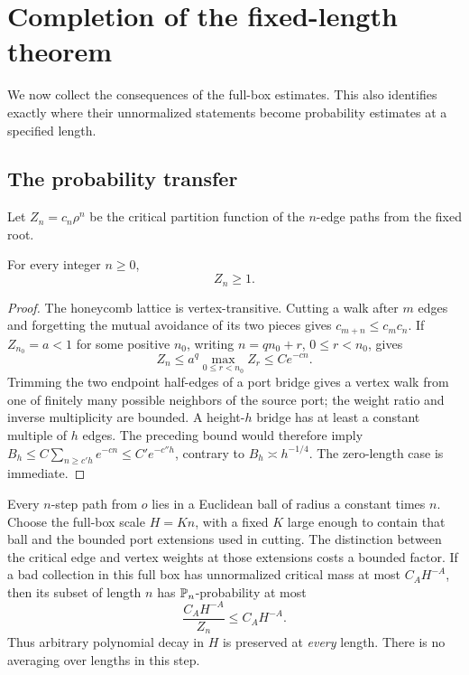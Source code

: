 \section{Completion of the fixed-length theorem}\label{sec:fixed-length}
We now collect the consequences of the full-box estimates. This also identifies exactly where their unnormalized statements become probability estimates at a specified length.

\subsection{The probability transfer}
Let \(Z_n=c_n\rho^n\) be the critical partition function of the
\(n\)-edge paths from the fixed root.
\begin{lemma}\label{09_fast_paths:normalization}
For every integer \(n\ge0\),
\begin{equation}\label{eq:normalization}
 Z_n\ge1.
\end{equation}
\end{lemma}
\begin{proof}
The honeycomb lattice is vertex-transitive. Cutting a walk after \(m\)
edges and forgetting the mutual avoidance of its two pieces gives
\(c_{m+n}\le c_mc_n\). If \(Z_{n_0}=a<1\) for some positive
\(n_0\), writing \(n=qn_0+r\), \(0\le r<n_0\), gives
\[
 Z_n\le a^q\max_{0\le r<n_0}Z_r\le Ce^{-cn}.
\]
Trimming the two endpoint half-edges of a port bridge gives a vertex
walk from one of finitely many possible neighbors of the source port;
the weight ratio and inverse multiplicity are bounded. A height-\(h\)
bridge has at least a constant multiple of \(h\) edges. The preceding
bound would therefore imply
\(B_h\le C\sum_{n\ge c'h}e^{-cn}\le C'e^{-c''h}\), contrary to
\(B_h\asymp h^{-1/4}\). The zero-length case is immediate.
\end{proof}

Every $n$-step path from $o$ lies in a Euclidean ball of radius a constant times $n$. Choose the full-box scale $H=Kn$, with a fixed $K$ large enough to contain that ball and the bounded port extensions used in cutting. The distinction between the critical edge and vertex weights at those extensions costs a bounded factor. If a bad collection in this full box has unnormalized critical mass at most $C_AH^{-A}$, then its subset of length $n$ has $\mathbb P_n$-probability at most
\[
 \frac{C_AH^{-A}}{Z_n}\le C_AH^{-A}.
\]
Thus arbitrary polynomial decay in $H$ is preserved at \emph{every} length. There is no averaging over lengths in this step.

